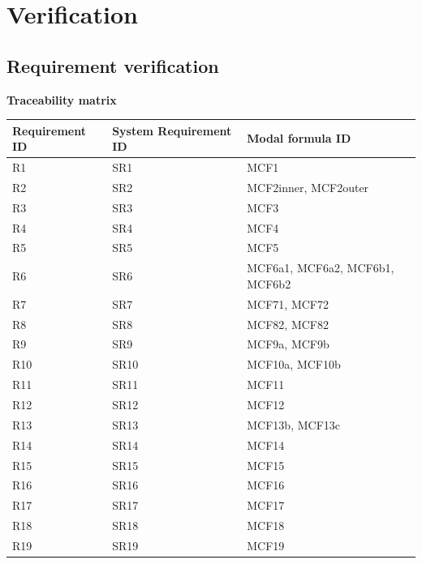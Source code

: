 \documentclass[12pt]{report}
\begin{document}
	\chapter{Verification}

    \section{Requirement verification}

    \textbf{Traceability matrix}\\
    \begin{tabular}{| l | l | l | }
        \hline
        Requirement ID & System Requirement ID & Modal formula ID \\ \hline
        R1 & SR1 & MCF1 \\ \hline
        R2 & SR2 & MCF2inner, MCF2outer \\ \hline
        R3 & SR3 & MCF3 \\ \hline
        R4 & SR4 & MCF4 \\ \hline
        R5 & SR5 & MCF5 \\ \hline
        R6 & SR6 & MCF6a1, MCF6a2, MCF6b1, MCF6b2 \\ \hline
        R7 & SR7 & MCF71, MCF72 \\ \hline
        R8 & SR8 & MCF82, MCF82 \\ \hline
        R9 & SR9 & MCF9a, MCF9b \\ \hline
        R10 & SR10 & MCF10a, MCF10b \\ \hline
        R11 & SR11 & MCF11 \\ \hline
        R12 & SR12 & MCF12 \\ \hline
        R13 & SR13 & MCF13b, MCF13c \\ \hline
        R14 & SR14 & MCF14 \\ \hline
        R15 & SR15 & MCF15 \\ \hline
        R16 & SR16 & MCF16 \\ \hline
        R17 & SR17 & MCF17 \\ \hline
        R18 & SR18 & MCF18 \\ \hline
        R19 & SR19 & MCF19 \\  \hline
    \end{tabular}

    \pagebreak
\end{document}
